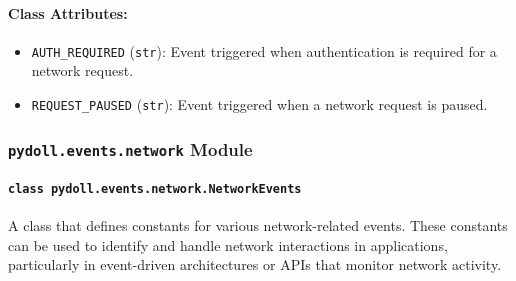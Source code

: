 \documentclass{article}
\begin{document}
\paragraph{Class Attributes:}
\begin{itemize}
    \item \texttt{AUTH\_REQUIRED} (\texttt{str}): Event triggered when authentication is required for a network request.
    \item \texttt{REQUEST\_PAUSED} (\texttt{str}): Event triggered when a network request is paused.
\end{itemize}

\subsubsection*{\texttt{pydoll.events.network} Module}

\paragraph*{\texttt{class pydoll.events.network.NetworkEvents}}
\noindent A class that defines constants for various network-related events. These constants can be used to identify and handle network interactions in applications, particularly in event-driven architectures or APIs that monitor network activity.
\end{document}
